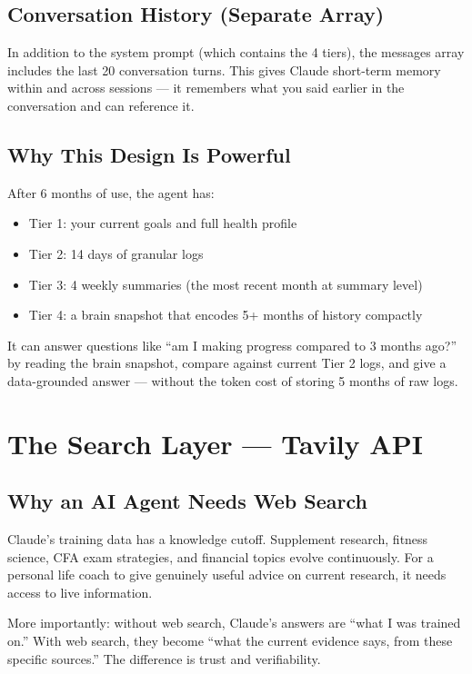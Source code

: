 \documentclass[12pt, a4paper]{article}
\begin{document}
\subsection{Conversation History (Separate Array)}

In addition to the system prompt (which contains the 4 tiers), the messages array includes the last 20 conversation turns. This gives Claude short-term memory within and across sessions --- it remembers what you said earlier in the conversation and can reference it.

\subsection{Why This Design Is Powerful}

After 6 months of use, the agent has:
\begin{itemize}[noitemsep]
    \item Tier 1: your current goals and full health profile
    \item Tier 2: 14 days of granular logs
    \item Tier 3: 4 weekly summaries (the most recent month at summary level)
    \item Tier 4: a brain snapshot that encodes 5+ months of history compactly
\end{itemize}

It can answer questions like ``am I making progress compared to 3 months ago?'' by reading the brain snapshot, compare against current Tier 2 logs, and give a data-grounded answer --- without the token cost of storing 5 months of raw logs.

\section{The Search Layer --- Tavily API}

\subsection{Why an AI Agent Needs Web Search}

Claude's training data has a knowledge cutoff. Supplement research, fitness science, CFA exam strategies, and financial topics evolve continuously. For a personal life coach to give genuinely useful advice on current research, it needs access to live information.

More importantly: without web search, Claude's answers are ``what I was trained on.'' With web search, they become ``what the current evidence says, from these specific sources.'' The difference is trust and verifiability.
\end{document}
